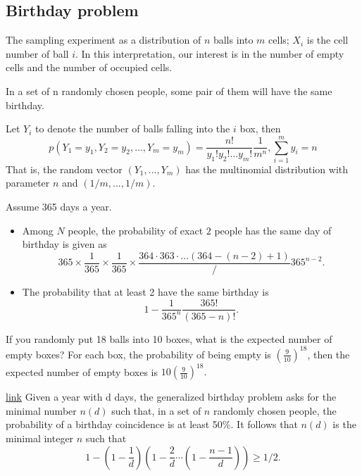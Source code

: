 \begin{refsection}
\subsection{Birthday problem}

\begin{definition}
The sampling experiment as a distribution of $n$ balls into $m$ cells; $X_i$ is the cell number of ball $i$. In this interpretation, our interest is in the number of empty cells and the number of occupied cells.	
\end{definition}


\begin{example}
In a set of n randomly chosen people, some pair of them will have the same birthday.
\end{example}


\begin{lemma}
Let $Y_i$ to denote the number of balls falling into the $i$ box, then
$$p(Y_1=y_1,Y_2=y_2,\dots,Y_m=y_m) = \frac{n!}{y_1!y_2!\dots y_m!}\frac{1}{m^n}, \sum_{i=1}^m y_i = n$$
That is, the random vector $(Y_1,...,Y_m)$ has the multinomial distribution with parameter $n$ and $(1/m,...,1/m)$.
\end{lemma}



\begin{example}
	Assume 365 days a year. \begin{itemize}
		\item Among $N$ people, the probability of exact $2$ people has the same day of birthday is given as
		$$365\times \frac{1}{365}\times \frac{1}{365}\times \frac{ 364 \cdot 363\cdot \dots (364-(n-2)+1)}/{365^{n-2}}.$$
		\item The probability that at least 2 have the same birthday is 
		$$1 - \frac{1}{365^n}\frac{365!}{(365-n)!}.$$
	\end{itemize} 
\end{example}

\begin{example}
If you randomly put 18 balls into 10 boxes, what is the expected number of empty boxes?
For each box, the probability of being empty is $(\frac{9}{10})^18$, then the expected number of empty boxes is $10(\frac{9}{10})^18.$
\end{example}


\begin{lemma}\href{https://en.wikipedia.org/wiki/Birthday_problem#The_generalized_birthday_problem}{link}
Given a year with d days, the generalized birthday problem asks for the minimal number $n(d)$ such that, in a set of $n$ randomly chosen people, the probability of a birthday coincidence is at least 50\%.
It follows that $n(d)$ is the minimal integer $n$ such that
$$1 - (1- \frac{1}{d})(1 - \frac{2}{d}\cdots (1 - \frac{n-1}{d}))\geq 1/2.$$
 	

\end{lemma}
\end{refsection}
